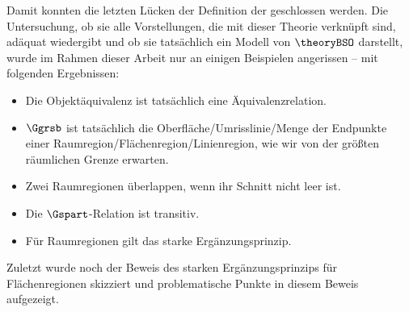     Damit
    konnten die letzten Lücken der Definition der \strukt geschlossen werden. 
    Die Untersuchung, ob sie alle Vorstellungen, die mit dieser Theorie verknüpft sind, adäquat wiedergibt und ob sie tatsächlich ein Modell von $\theoryBSO$ darstellt, wurde im Rahmen dieser Arbeit nur an einigen Beispielen angerissen -- mit folgenden Ergebnissen:
    \begin{itemize}
        \item Die Objektäquivalenz ist tatsächlich eine Äquivalenzrelation.
        \item $\Ggrsb$ ist tatsächlich die Oberfläche/Umrisslinie/Menge der Endpunkte einer Raumregion/Flächenregion/Linienregion, wie wir von der größten räumlichen Grenze erwarten.
        \item Zwei Raumregionen überlappen, wenn ihr Schnitt nicht leer ist.
        \item Die $\Gspart$-Relation ist transitiv.
        \item Für Raumregionen gilt das starke Ergänzungsprinzip.
    \end{itemize}
    Zuletzt wurde noch der Beweis des starken Ergänzungsprinzips für Flächenregionen skizziert und problematische Punkte in diesem Beweis aufgezeigt.



